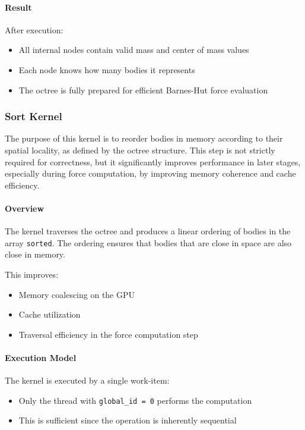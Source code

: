 \documentclass[12pt]{article}
\begin{document}
\paragraph{Result}

After execution:

\begin{itemize}
    \item All internal nodes contain valid mass and center of mass values
    \item Each node knows how many bodies it represents
    \item The octree is fully prepared for efficient Barnes-Hut force evaluation
\end{itemize}

\subsubsection{Sort Kernel}

The purpose of this kernel is to reorder bodies in memory according to their spatial locality,
as defined by the octree structure. This step is not strictly required for correctness,
but it significantly improves performance in later stages, especially during force computation,
by improving memory coherence and cache efficiency.

\paragraph{Overview}

The kernel traverses the octree and produces a linear ordering of bodies in the array
\texttt{sorted}. The ordering ensures that bodies that are close in space are also
close in memory.

This improves:
\begin{itemize}
    \item Memory coalescing on the GPU
    \item Cache utilization
    \item Traversal efficiency in the force computation step
\end{itemize}

\paragraph{Execution Model}

The kernel is executed by a single work-item:

\begin{itemize}
    \item Only the thread with \texttt{global\_id = 0} performs the computation
    \item This is sufficient since the operation is inherently sequential
\end{itemize}
\end{document}
